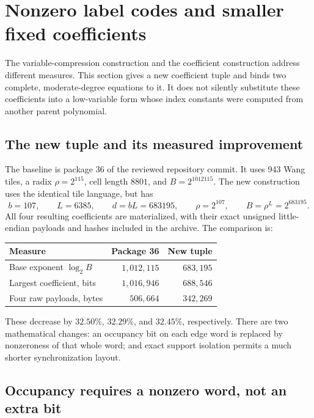 \section{Nonzero label codes and smaller fixed coefficients}
\label{sec:coefficient-refinement}

The variable-compression construction and the coefficient construction
address different measures.  This section gives a new coefficient tuple
and binds two complete, moderate-degree equations to it.  It does not
silently substitute these coefficients into a low-variable form whose
index constants were computed from another parent polynomial.

\subsection{The new tuple and its measured improvement}

The baseline is package 36 of the reviewed repository commit.  It uses
943 Wang tiles, a radix $\rho=2^{115}$, cell length $8801$, and
$B=2^{1012115}$.  The new construction uses the identical tile language,
but has
\begin{equation}
 b=107,\qquad L=6385,\qquad d=bL=683195,\qquad
 \rho=2^{107},\qquad B=\rho^L=2^{683195}.
 \label{eq:nonzero-base}
\end{equation}
All four resulting coefficients are materialized, with their exact
unsigned little-endian payloads and hashes included in the archive.
The comparison is:
\begin{center}
\begin{tabular}{lrr}
\hline
Measure & Package 36 & New tuple\\
\hline
Base exponent $\log_2 B$ & $1{,}012{,}115$ & $683{,}195$\\
Largest coefficient, bits & $1{,}016{,}946$ & $688{,}546$\\
Four raw payloads, bytes & $506{,}664$ & $342{,}269$\\
\hline
\end{tabular}
\end{center}
These decrease by $32.50\%$, $32.29\%$, and $32.45\%$, respectively.
There are two mathematical changes: an occupancy bit on each edge word
is replaced by nonzeroness of that whole word; and exact support
isolation permits a much shorter synchronization layout.

\subsection{Occupancy requires a nonzero word, not an extra bit}

